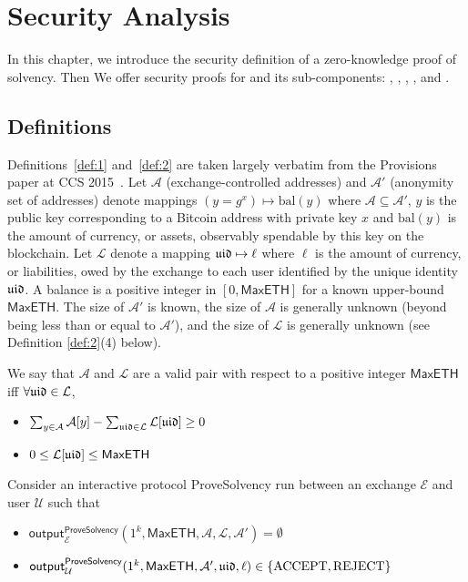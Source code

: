 \chapter{Security Analysis}
\label{sec:proof}

In this chapter, we introduce the security definition of a zero-knowledge proof of solvency. Then We offer security proofs for \Sys and its sub-components: \bootstrap, \userproof, \pol, \poa, and \pos.

\section{Definitions}

Definitions~\ref{def:1} and~\ref{def:2} are taken largely verbatim from the Provisions paper at CCS 2015~\cite{provisions}. Let $\mathcal{A}$ (exchange-controlled addresses) and $\mathcal{A}'$ (anonymity set of addresses) denote mappings $(y = g^x) \mapsto \text{bal}(y)$ where $\mathcal{A} \subseteq \mathcal{A}'$, $y$ is the public key corresponding to a Bitcoin address with private key $x$ and $\text{bal}(y)$ is the amount of currency, or assets, observably spendable by this key on the blockchain. Let $\mathcal{L}$ denote a mapping $\mathfrak{uid} \mapsto \ell$ where $\ell$ is the amount of currency, or liabilities, owed by the exchange to each user identified by the unique identity $\mathfrak{uid}$. A balance is a positive integer in $[0,\mathsf{MaxETH}]$ for a known upper-bound $\mathsf{MaxETH}$. The size of $\mathcal{A}'$ is known, the size of $\mathcal{A}$ is generally unknown (beyond being less than or equal to $\mathcal{A}'$), and the size of $\mathcal{L}$ is generally unknown (see Definition \ref{def:2}(4) below). 

\begin{definition}
\label{def:1} We say that $\mathcal{A}$ and $\mathcal{L}$ are a valid pair with respect to a positive integer $\mathsf{MaxETH}$ iff $\forall \mathfrak{uid} \in \mathcal{L}$,

\begin{itemize}
\item $\sum_{y \in \mathcal{A}} \mathcal{A}[y] - \sum_{\mathfrak{uid} \in \mathcal{L}} \mathcal{L}[\mathfrak{uid}] \geq 0 \quad$
\item $0 \leq \mathcal{L}[\mathfrak{uid}] \leq \mathsf{MaxETH}$
\end{itemize}
Consider an interactive protocol ProveSolvency run between an exchange $\mathcal{E}$ and user $\mathcal{U}$ such that

\begin{itemize}
\item $\mathsf{output}_{\mathcal{E}}^{\mathsf{ProveSolvency}}(1^k, \mathsf{MaxETH}, \mathcal{A}, \mathcal{L}, \mathcal{A}') = \emptyset$
\item $\mathsf{output}_{\mathcal{U}}^{\mathsf{ProveSolvency}}(1^k, \mathsf{MaxETH}, \mathcal{A}', \mathfrak{uid}, \ell) \in \{\text{ACCEPT}, \text{REJECT}\}$
\end{itemize}
   
\end{definition}


